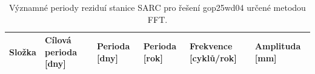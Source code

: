 \begin{table}[htbp]
\caption{Významné periody reziduí stanice SARC pro řešení gop25wd04 určené metodou FFT.}
\label{tab:gop25wd04_stcd_sarc_detr_weighted_1seg_spectral_fft_significant_periods}
\begin{tabular}{llllll}
\toprule
Složka & Cílová perioda [dny] & Perioda [dny] & Perioda [rok] & Frekvence [cyklů/rok] & Amplituda [mm] \\
\midrule
\bottomrule
\end{tabular}
\end{table}
